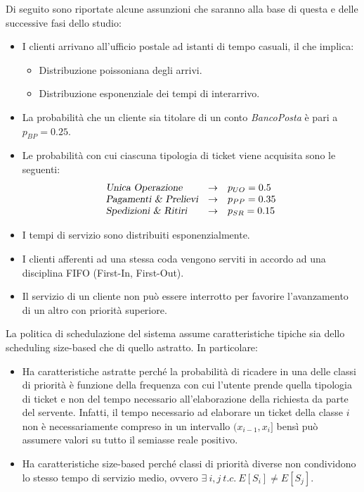 Di seguito sono riportate alcune assunzioni che saranno alla base di questa e delle successive fasi dello studio:
\begin{itemize}
\item I clienti arrivano all'ufficio postale ad istanti di tempo casuali, il che implica:
\begin{itemize}
\item Distribuzione poissoniana degli arrivi.
\item Distribuzione esponenziale dei tempi di interarrivo.
\end{itemize}
\item La probabilità che un cliente sia titolare di un conto \textsl{BancoPosta} è pari a $p_{BP} = 0.25$.
\item Le probabilità con cui ciascuna tipologia di ticket viene acquisita sono le seguenti:
\begin{equation*}
\begin{array}{l c l}
\textsl{Unica Operazione}{} & \rightarrow & p_{UO} = 0.5 \\
\textsl{Pagamenti \& Prelievi}{} & \rightarrow & p_{PP} = 0.35 \\
\textsl{Spedizioni \& Ritiri}{} & \rightarrow & p_{SR} = 0.15
\end{array}
\end{equation*} 
\item I tempi di servizio sono distribuiti esponenzialmente.
\item I clienti afferenti ad una stessa coda vengono serviti in accordo ad una disciplina FIFO (First-In, First-Out).
\item Il servizio di un cliente non può essere interrotto per favorire l'avanzamento di un altro con priorità superiore.
\end{itemize}

La politica di schedulazione del sistema assume caratteristiche tipiche sia dello scheduling size-based che di quello astratto. In particolare:
\begin{itemize}
\item Ha caratteristiche astratte perché la probabilità di ricadere in una delle classi di priorità è funzione della frequenza con cui l'utente prende quella tipologia di ticket e non del tempo necessario all'elaborazione della richiesta da parte del servente. Infatti, il tempo necessario ad elaborare un ticket della classe $i$ non è necessariamente compreso in un intervallo $(x_{i-1}, x_i]$ bensì può assumere valori su tutto il semiasse reale positivo. 
\item Ha caratteristiche size-based perché classi di priorità diverse non condividono lo stesso tempo di servizio medio, ovvero $\exists\ i,j\ t.c.\ E[S_i] \neq E[S_j]$.
\end{itemize}

